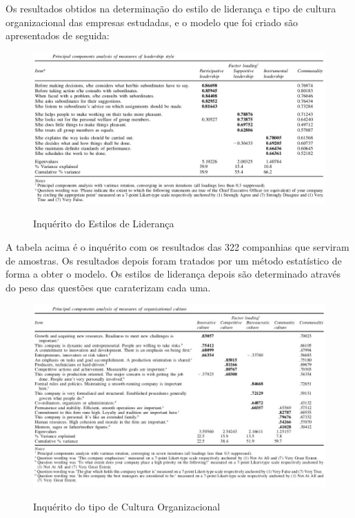 \minipagespace{.5cm}
Os resultados obtidos na determinação do estilo de liderança e tipo de cultura organizacional das empresas estudadas, e o modelo que foi criado são apresentados de seguida:
\begin{figure}[H]
\centering
\includegraphics[scale=.4]{./image/OB/Leadership.jpg}\\
\caption{Inquérito do Estilos de Liderança \cite{article_1}}
\end{figure}\par
A tabela acima é o inquérito com os resultados das 322 companhias que serviram de amostras. Os resultados depois foram tratados por um método estatístico de forma a obter o modelo. Os estilos de liderança depois são determinado através do peso das questões que caraterizam cada uma.
\begin{figure}[H]
\centering
\includegraphics[scale=.5]{./image/OB/Culture.jpg}\\
\caption{Inquérito do tipo de Cultura Organizacional \cite{article_1}}
\end{figure}\par
